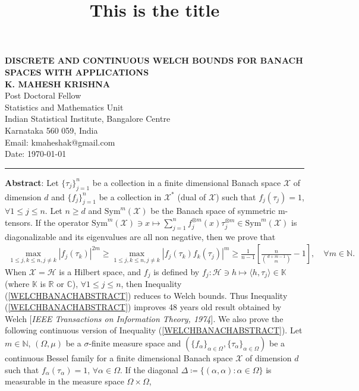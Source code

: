 \documentclass{amsart}
\title{This is the title}
\begin{document}
\begin{center}
{\bf{DISCRETE AND CONTINUOUS WELCH BOUNDS  FOR  BANACH SPACES WITH APPLICATIONS}}\\
\textbf{K. MAHESH KRISHNA}\\
Post Doctoral Fellow \\
Statistics and Mathematics Unit\\
Indian Statistical Institute, Bangalore Centre\\
Karnataka 560 059, India\\
Email: kmaheshak@gmail.com\\

Date: \today
\end{center}
\hrule
\vspace{0.5cm}
\textbf{Abstract}: 	Let $\{\tau_j\}_{j=1}^n$ be a collection in a finite dimensional Banach space $\mathcal{X}$ of dimension $d$  and 	$\{f_j\}_{j=1}^n$ be a collection in  $\mathcal{X}^*$ (dual of $\mathcal{X}$) such that 	$f_j(\tau_j) =1$, $\forall 1\leq j\leq n$. 	Let $n\geq d$ and   $\text{Sym}^m(\mathcal{X})$ be  the Banach  space of symmetric m-tensors.   If the  operator $	\text{Sym}^m(\mathcal{X})\ni x \mapsto  \sum_{j=1}^nf_j^{\otimes m}(x)\tau_j ^{\otimes m}\in\text{Sym}^m(\mathcal{X})$	 is diagonalizable and its eigenvalues are all non negative, then  we prove that 
\begin{align}\label{WELCHBANACHABSTRACT}
\max _{1\leq j,k \leq n, j\neq k}|f_j(\tau_k)|^{2m}\geq \max _{1\leq j,k \leq n, j\neq k}|f_j(\tau_k)f_k(\tau_j)|^m \geq\frac{1}{n-1}\left[\frac{n}{{d+m-1\choose m}}-1\right], \quad \forall m \in \mathbb{N}.
\end{align}
When $	\mathcal{X}=\mathcal{H}$  is a Hilbert space, and $f_j$  is defined by $f_j: \mathcal{H}\ni h \mapsto \langle h, \tau_j \rangle \in \mathbb{K}$ (where $\mathbb{K}$ is $\mathbb{R}$ or $\mathbb{C}$), $\forall 1 \leq j \leq n$, then Inequality (\ref{WELCHBANACHABSTRACT}) reduces to Welch bounds. Thus Inequality (\ref{WELCHBANACHABSTRACT})   improves 48 years old result  obtained by Welch [\textit{IEEE Transactions on  Information Theory, 1974}]. We also prove the following continuous version of Inequality (\ref{WELCHBANACHABSTRACT}). Let $m \in \mathbb{N}$, $(\Omega, \mu)$ be a $\sigma$-finite measure space and $(\{f_\alpha\}_{\alpha\in \Omega}, \{\tau_\alpha\}_{\alpha\in \Omega})$ be a  continuous Bessel  family for a finite dimensional Banach   space $\mathcal{X}$ of dimension $d$ such that $f_\alpha(\tau_\alpha)=1$, $\forall \alpha \in \Omega$.  If the diagonal $\Delta\coloneqq \{(\alpha, \alpha):\alpha \in \Omega\}$ is measurable in the measure space $\Omega\times \Omega$,
\end{document}
